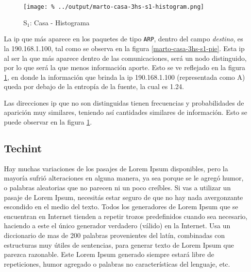 \documentclass[final,inline,a4paper,narroweqnarray]{ieee}
\begin{document}
    \begin{figure}[ht]\begin{center}
      \texttt{[image: \%
      ../output/marto-casa-3hs-s1-histogram.png]}
      \vspace{-2em}
      \caption{S$_1$: Casa - Histograma}
      \label{marto-casa-3hs-s1-histogram}
    \end{center}\end{figure}	

  La ip que más aparece en los paquetes de tipo \texttt{ARP}, dentro del
  campo \textit{destino}, es la 190.168.1.100, tal como se observa en la
  figura \ref{marto-casa-3hs-s1-pie}. Esta ip al ser la que más aparece
  dentro de las comunicaciones, será un nodo distinguido, por lo que será la
  que menos información aporte. Esto se ve reflejado en la figura
  \ref{marto-casa-3hs-s1-histogram}, en donde la información que brinda la
  ip 190.168.1.100 (representada como A) queda por debajo de la entropía de
  la fuente, la cual es 1.24.  

  Las direcciones ip que no son distinguidas tienen frecuencias y
  probabilidades de aparición muy similares, teniendo así
  cantidades similares de información. Esto se puede observar en la figura
  \ref{marto-casa-3hs-s1-histogram}.


  \subsection{Techint}

Hay muchas variaciones de los pasajes de Lorem Ipsum disponibles, pero la mayoría sufrió alteraciones en alguna manera, ya sea porque se le agregó humor, o palabras aleatorias que no parecen ni un poco creíbles. Si vas a utilizar un pasaje de Lorem Ipsum, necesitás estar seguro de que no hay nada avergonzante escondido en el medio del texto. Todos los generadores de Lorem Ipsum que se encuentran en Internet tienden a repetir trozos predefinidos cuando sea necesario, haciendo a este el único generador verdadero (válido) en la Internet. Usa un diccionario de mas de 200 palabras provenientes del latín, combinadas con estructuras muy útiles de sentencias, para generar texto de Lorem Ipsum que parezca razonable. Este Lorem Ipsum generado siempre estará libre de repeticiones, humor agregado o palabras no características del lenguaje, etc.
\end{document}
